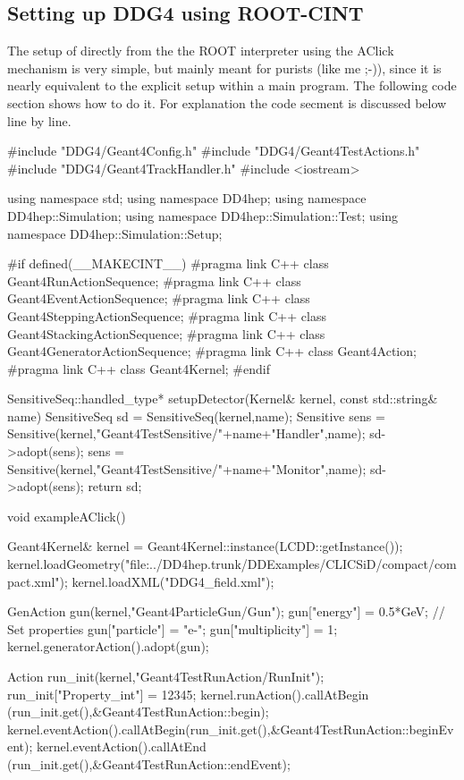 \documentclass[10pt,a4paper]{article}
\begin{document}
\newpage
\subsection{Setting up DDG4 using ROOT-CINT}
\label{sec:ddg4-implementation-setup-root-cint}

\noindent
The setup of \DDG directly from the the ROOT interpreter using the AClick
mechanism is very simple, but mainly meant for purists (like me ;-)),
since it is nearly equivalent to the explicit setup within a  
main program.
The following code section shows how to do it. For explanation the code
secment is discussed below line by line.
\begin{code}
#include "DDG4/Geant4Config.h"
#include "DDG4/Geant4TestActions.h"
#include "DDG4/Geant4TrackHandler.h"
#include <iostream>

using namespace std;
using namespace DD4hep;
using namespace DD4hep::Simulation;
using namespace DD4hep::Simulation::Test;
using namespace DD4hep::Simulation::Setup;

#if defined(__MAKECINT__)
#pragma link C++ class Geant4RunActionSequence;
#pragma link C++ class Geant4EventActionSequence;
#pragma link C++ class Geant4SteppingActionSequence;
#pragma link C++ class Geant4StackingActionSequence;
#pragma link C++ class Geant4GeneratorActionSequence;
#pragma link C++ class Geant4Action;
#pragma link C++ class Geant4Kernel;
#endif

SensitiveSeq::handled_type* setupDetector(Kernel& kernel, const std::string& name)   {
  SensitiveSeq sd = SensitiveSeq(kernel,name);
  Sensitive  sens = Sensitive(kernel,"Geant4TestSensitive/"+name+"Handler",name);
  sd->adopt(sens);
  sens = Sensitive(kernel,"Geant4TestSensitive/"+name+"Monitor",name);
  sd->adopt(sens);
  return sd;
}

void exampleAClick()  {
  Geant4Kernel& kernel = Geant4Kernel::instance(LCDD::getInstance());
  kernel.loadGeometry("file:../DD4hep.trunk/DDExamples/CLICSiD/compact/compact.xml");
  kernel.loadXML("DDG4_field.xml");

  GenAction gun(kernel,"Geant4ParticleGun/Gun");
  gun["energy"] = 0.5*GeV;                          // Set properties
  gun["particle"] = "e-";
  gun["multiplicity"] = 1;
  kernel.generatorAction().adopt(gun);

  Action run_init(kernel,"Geant4TestRunAction/RunInit");
  run_init["Property_int"] = 12345;
  kernel.runAction().callAtBegin  (run_init.get(),&Geant4TestRunAction::begin);
  kernel.eventAction().callAtBegin(run_init.get(),&Geant4TestRunAction::beginEvent);
  kernel.eventAction().callAtEnd  (run_init.get(),&Geant4TestRunAction::endEvent);

}
\end{code}
\end{document}
